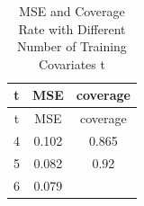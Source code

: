 \documentclass[]{article}
\begin{document}
\begin{longtable}[]{@{}ccc@{}}
\caption{MSE and Coverage Rate with Different Number of Training
Covariates t}\tabularnewline
\toprule
\begin{minipage}[b]{0.05\columnwidth}\centering\strut
t\strut
\end{minipage} & \begin{minipage}[b]{0.10\columnwidth}\centering\strut
MSE\strut
\end{minipage} & \begin{minipage}[b]{0.13\columnwidth}\centering\strut
coverage\strut
\end{minipage}\tabularnewline
\midrule
\endfirsthead
\toprule
\begin{minipage}[b]{0.05\columnwidth}\centering\strut
t\strut
\end{minipage} & \begin{minipage}[b]{0.10\columnwidth}\centering\strut
MSE\strut
\end{minipage} & \begin{minipage}[b]{0.13\columnwidth}\centering\strut
coverage\strut
\end{minipage}\tabularnewline
\midrule
\endhead
\begin{minipage}[t]{0.05\columnwidth}\centering\strut
4\strut
\end{minipage} & \begin{minipage}[t]{0.10\columnwidth}\centering\strut
0.102\strut
\end{minipage} & \begin{minipage}[t]{0.13\columnwidth}\centering\strut
0.865\strut
\end{minipage}\tabularnewline
\begin{minipage}[t]{0.05\columnwidth}\centering\strut
5\strut
\end{minipage} & \begin{minipage}[t]{0.10\columnwidth}\centering\strut
0.082\strut
\end{minipage} & \begin{minipage}[t]{0.13\columnwidth}\centering\strut
0.92\strut
\end{minipage}\tabularnewline
\begin{minipage}[t]{0.05\columnwidth}\centering\strut
6\strut
\end{minipage} & \begin{minipage}[t]{0.10\columnwidth}\centering\strut
0.079\strut
\end{minipage} & \begin{minipage}[t]{0.13\columnwidth}\centering\strut

\end{minipage}
\end{longtable}
\end{document}

